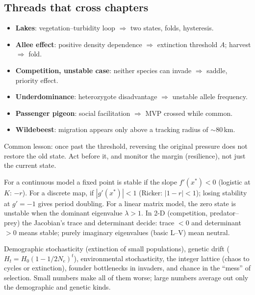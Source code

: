 \subsection{Threads that cross chapters}
\begin{chain}
\begin{itemize}
\item \textbf{Lakes}: vegetation--turbidity loop $\Rightarrow$ two states, folds, hysteresis.
\item \textbf{Allee effect}: positive density dependence $\Rightarrow$ extinction threshold $A$; harvest $\Rightarrow$ fold.
\item \textbf{Competition, unstable case}: neither species can invade $\Rightarrow$ saddle, priority effect.
\item \textbf{Underdominance}: heterozygote disadvantage $\Rightarrow$ unstable allele frequency.
\item \textbf{Passenger pigeon}: social facilitation $\Rightarrow$ MVP crossed while common.
\item \textbf{Wildebeest}: migration appears only above a tracking radius of $\sim$80\,km.
\end{itemize}
Common lesson: once past the threshold, reversing the original pressure does not restore the old state. Act before it, and
monitor the margin (resilience), not just the current state.
\end{chain}

\begin{chain}
For a continuous model a fixed point is stable if the slope $f'(x^*)<0$ (logistic at $K$: $-r$). For a discrete map, if
$|g'(x^*)|<1$ (Ricker: $|1-r|<1$); losing stability at $g'=-1$ gives period doubling. For a linear matrix model, the zero
state is unstable when the dominant eigenvalue $\lambda>1$. In 2-D (competition, predator--prey) the Jacobian's trace and
determinant decide: trace $<0$ and determinant $>0$ means stable; purely imaginary eigenvalues (basic L--V) mean neutral.
\end{chain}

\begin{chain}
Demographic stochasticity (extinction of small populations), genetic drift ($H_t=H_0(1-1/2N_e)^t$), environmental
stochasticity, the integer lattice (chaos to cycles or extinction), founder bottlenecks in invaders, and chance in the
``mess'' of selection. Small numbers make all of them worse; large numbers average out only the demographic and genetic kinds.
\end{chain}

